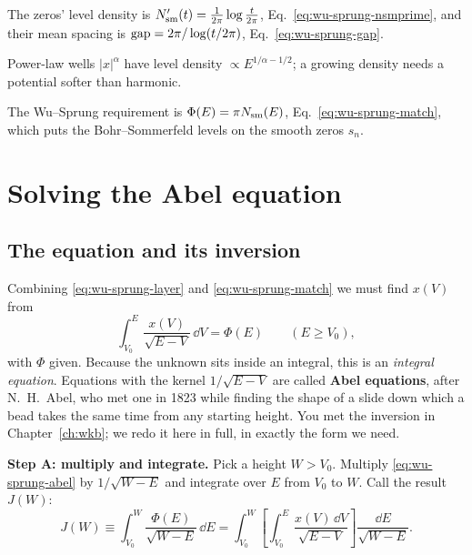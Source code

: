 \begin{keyideas}
\item The zeros' level density is $N_{\mathrm{sm}}'(t)=\frac{1}{2\pi}\log\frac{t}{2\pi}$, Eq.~\eqref{eq:wu-sprung-nsmprime}, and their mean spacing is $\mathrm{gap}=2\pi/\log(t/2\pi)$, Eq.~\eqref{eq:wu-sprung-gap}.
\item Power-law wells $|x|^\alpha$ have level density $\propto E^{1/\alpha-1/2}$; a growing density needs a potential softer than harmonic.
\item The Wu--Sprung requirement is $\Phi(E)=\pi N_{\mathrm{sm}}(E)$, Eq.~\eqref{eq:wu-sprung-match}, which puts the Bohr--Sommerfeld levels on the smooth zeros $s_n$.
\end{keyideas}

\section{Solving the Abel equation}\label{sec:wu-sprung-abel}

\subsection{The equation and its inversion}

Combining \eqref{eq:wu-sprung-layer} and \eqref{eq:wu-sprung-match} we must find $x(V)$ from
\begin{equation}
\int_{V_0}^{E}\frac{x(V)}{\sqrt{E-V}}\,\dd V=\Phi(E)\qquad(E\ge V_0),
\label{eq:wu-sprung-abel}
\end{equation}
with $\Phi$ given. Because the unknown sits inside an integral, this is an \emph{integral equation}. Equations with the kernel $1/\sqrt{E-V}$ are called \textbf{Abel equations}, after N.~H.~Abel, who met one in 1823 while finding the shape of a slide down which a bead takes the same time from any starting height. You met the inversion in Chapter~\ref{ch:wkb}; we redo it here in full, in exactly the form we need.

\textbf{Step A: multiply and integrate.} Pick a height $W>V_0$. Multiply \eqref{eq:wu-sprung-abel} by $1/\sqrt{W-E}$ and integrate over $E$ from $V_0$ to $W$. Call the result $J(W)$:
\begin{equation}
J(W)\equiv\int_{V_0}^{W}\frac{\Phi(E)}{\sqrt{W-E}}\,\dd E=\int_{V_0}^{W}\left[\int_{V_0}^{E}\frac{x(V)\,\dd V}{\sqrt{E-V}}\right]\frac{\dd E}{\sqrt{W-E}} .
\label{eq:wu-sprung-J}
\end{equation}

